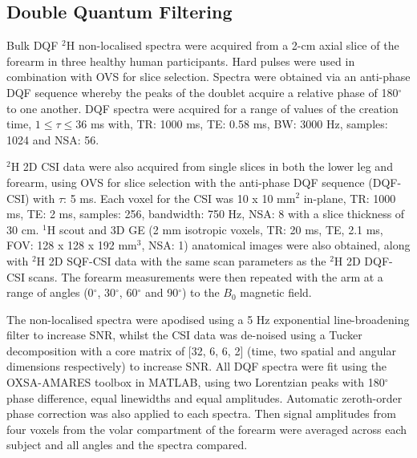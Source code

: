 \subsection{Double Quantum Filtering}

Bulk \ac{DQF} $^2$H non-localised spectra were acquired from a 2-cm axial slice of the forearm in three healthy human participants. Hard pulses were used in combination with \ac{OVS} for slice selection. Spectra were obtained via an anti-phase \ac{DQF} sequence \cite{Sharf1995DetectionNMR-Spectroscopy} whereby the peaks of the doublet acquire a relative phase of 180$^\circ$ to one another. \ac{DQF} spectra were acquired for a range of values of the creation time, $1\leq\tau\leq36$ ms with, \ac{TR}: 1000 ms, \ac{TE}: 0.58 ms, \ac{BW}: 3000 Hz, samples: 1024 and NSA: 56.

$^2$H 2D \ac{CSI} data were also acquired from single slices in both the lower leg and forearm, using \ac{OVS} for slice selection with the anti-phase \ac{DQF} sequence (\ac{DQF}-\ac{CSI}) with $\tau$: 5 ms. Each voxel for the \ac{CSI} was 10 x 10 mm$^2$ in-plane, \ac{TR}: 1000 ms, \ac{TE}: 2 ms, samples: 256, bandwidth: 750 Hz, NSA: 8 with a slice thickness of 30 cm. $^1$H scout and 3D \ac{GE} (2 mm isotropic voxels, \ac{TR}: 20 ms, \ac{TE}, 2.1 ms, \ac{FOV}: 128 x 128 x 192 mm$^3$, NSA: 1) anatomical images were also obtained, along with $^2$H 2D \ac{SQF}-\ac{CSI} data with the same scan parameters as the $^2$H 2D \ac{DQF}-\ac{CSI} scans. The forearm measurements were then repeated with the arm at a range of angles (0$^\circ$, 30$^\circ$, 60$^\circ$ and 90$^\circ$) to the $B_0$ magnetic field. 

The non-localised spectra were apodised using a 5 Hz exponential line-broadening filter to increase \ac{SNR}, whilst the \ac{CSI} data was de-noised using a Tucker decomposition \cite{Bader2007EfficientTensors} with a core matrix of [32, 6, 6, 2] (time, two spatial and angular dimensions respectively) to increase \ac{SNR}. All \ac{DQF} spectra were fit using the OXSA-AMARES \cite{Purvis2017OXSA:MATLAB} toolbox in MATLAB, using two Lorentzian peaks with 180$^\circ$ phase difference, equal linewidths and equal amplitudes. Automatic zeroth-order phase correction was also applied to each spectra. Then signal amplitudes from four voxels from the volar compartment of the forearm were averaged across each subject and all angles and the spectra compared.

